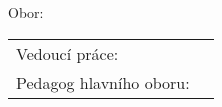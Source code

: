 
\pagestyle{empty}

\begin{center}

	\begin{Large}
		\noindent
		{\textbf{\MakeUppercase{\skola}}}
	\end{Large}

	\vfill

	\begin{Large}
		\noindent
		{\typPrace}
	\end{Large}

	\begin{spacing}{1.8}
		\begin{huge}
			\noindent
			\textbf{\MakeUppercase{\appTema}}
		\end{huge}
	\end{spacing}

	\vfill

	\begin{Large}
		\noindent
		\textbf{\autor}
	\end{Large}


	\begin{large}
		\noindent
		Obor: {\studijniObor}

		\noindent
		{\studijniProgram}
	\end{large}

\end{center}

\vfill

\begin{large}
	\begin{spacing}{1.2}
	\begin{tabularx}{\textwidth}{ l X }
		Vedoucí práce:	& {\appVedouci} \\
		Pedagog hlavního oboru:	& {\appUcitel} \\
	\end{tabularx}
	\end{spacing}
\end{large}

\vfill

\begin{center}
	\begin{large}
		\noindent
		\textbf{\MakeUppercase{\misto}}

		\noindent
		\textbf{\MakeUppercase{\skolniRok}}
	\end{large}
\end{center}

\newpage

